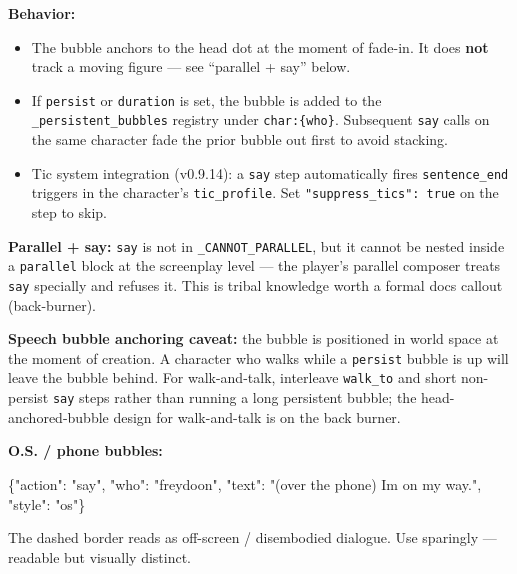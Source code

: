 \documentclass[
  12pt,
  letterpaper,
]{book}
\newenvironment{Shaded}{}{}
\newcommand{\DataTypeTok}[1]{\textcolor[rgb]{0.56,0.13,0.00}{#1}}
\newcommand{\FunctionTok}[1]{\textcolor[rgb]{0.02,0.16,0.49}{#1}}
\newcommand{\StringTok}[1]{\textcolor[rgb]{0.25,0.44,0.63}{#1}}
\providecommand{\tightlist}{%
  \setlength{\itemsep}{0pt}\setlength{\parskip}{0pt}}
\begin{document}
\textbf{Behavior:}

\begin{itemize}
\tightlist
\item
  The bubble anchors to the head dot at the moment of fade-in. It does
  \textbf{not} track a moving figure --- see ``parallel + say'' below.
\item
  If \texttt{persist} or \texttt{duration} is set, the bubble is added
  to the \texttt{\_persistent\_bubbles} registry under
  \texttt{char:\{who\}}. Subsequent \texttt{say} calls on the same
  character fade the prior bubble out first to avoid stacking.
\item
  Tic system integration (v0.9.14): a \texttt{say} step automatically
  fires \texttt{sentence\_end} triggers in the character's
  \texttt{tic\_profile}. Set \texttt{"suppress\_tics":\ true} on the
  step to skip.
\end{itemize}

\textbf{Parallel + say:} \texttt{say} is not in
\texttt{\_CANNOT\_PARALLEL}, but it cannot be nested inside a
\texttt{parallel} block at the screenplay level --- the player's
parallel composer treats \texttt{say} specially and refuses it. This is
tribal knowledge worth a formal docs callout (back-burner).

\textbf{Speech bubble anchoring caveat:} the bubble is positioned in
world space at the moment of creation. A character who walks while a
\texttt{persist} bubble is up will leave the bubble behind. For
walk-and-talk, interleave \texttt{walk\_to} and short non-persist
\texttt{say} steps rather than running a long persistent bubble; the
head-anchored-bubble design for walk-and-talk is on the back burner.

\textbf{O.S. / phone bubbles:}

\begin{Shaded}
\begin{Highlighting}[]
\FunctionTok{\{}\DataTypeTok{"action"}\FunctionTok{:} \StringTok{"say"}\FunctionTok{,} \DataTypeTok{"who"}\FunctionTok{:} \StringTok{"freydoon"}\FunctionTok{,}
 \DataTypeTok{"text"}\FunctionTok{:} \StringTok{"(over the phone) I\textquotesingle{}m on my way."}\FunctionTok{,} \DataTypeTok{"style"}\FunctionTok{:} \StringTok{"os"}\FunctionTok{\}}
\end{Highlighting}
\end{Shaded}

The dashed border reads as off-screen / disembodied dialogue. Use
sparingly --- readable but visually distinct.
\end{document}
